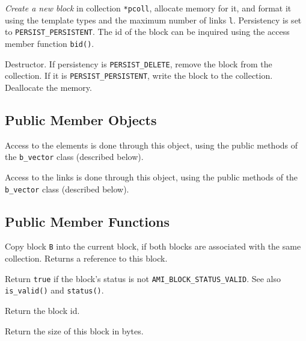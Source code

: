          {{\em
        Create a new block} in collection \lstinline|*pcoll|, allocate memory for
        it, and format it using the template types and the maximum number
        of links \lstinline|l|. Persistency is set to \lstinline|PERSIST_PERSISTENT|. The id of the block can be inquired using the
        access member function \lstinline|bid()|.}

         {Destructor. If persistency 
        is \lstinline|PERSIST_DELETE|, remove the block from the collection. 
        If it is \lstinline|PERSIST_PERSISTENT|, write the block to the 
        collection. Deallocate the memory.}

   \etabb

\subsection{Public Member Objects}

   \btabb

         {Access to the elements is done through
        this object, using the public methods of the \lstinline|b_vector| class
        (described below).}

         {Access to the links is done
        through this object, using the public methods of the \lstinline|b_vector| class (described below).}

   \etabb

\subsection{Public Member Functions}

   \btabb
        
         {Copy
        block \lstinline|B| into the current block, if both blocks are associated
        with the same collection. Returns a reference to this block.}

         {Return \lstinline|true| if the block's status 
        is not \lstinline|AMI_BLOCK_STATUS_VALID|. See also \lstinline|is_valid()| and 
        \lstinline|status()|.}

         {Return the block id.}

         {Return the size of this block
        in bytes.}

